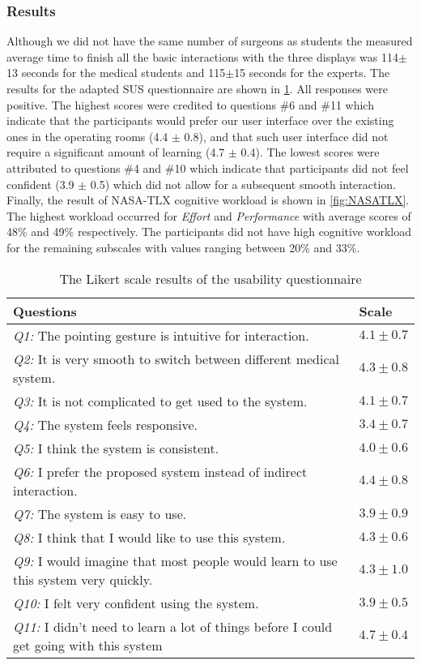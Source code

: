 \subsubsection{Results}
Although we did not have the same number of surgeons as students the measured average time to finish all the basic interactions with the three displays was 114$\pm$13 seconds for the medical students and 115$\pm$15 seconds for the experts. 
The results for the adapted SUS questionnaire are shown in \tablename{\ref{tb:questionnaire}}.
All responses were positive. The highest scores were credited to questions \#6 and \#11 which indicate that the participants would prefer our user interface over the existing ones in the operating rooms (4.4 $\pm$ 0.8), and that such user interface did not require a significant amount of learning (4.7 $\pm$ 0.4). The lowest scores were attributed to questions \#4 and \#10 which indicate that participants did not feel confident (3.9 $\pm$ 0.5) which did not allow for a subsequent smooth interaction. Finally, the result of NASA-TLX cognitive workload is shown in \figurename{\ref{fig:NASATLX}}. The highest workload occurred for \textit{Effort} and \textit{Performance} with average scores of 48\% and 49\% respectively. The participants did not have high cognitive workload for the remaining subscales with values ranging between 20\% and 33\%.
\begin{table}
	\caption{The Likert scale results of the usability questionnaire}
	\label{tb:questionnaire}
	\scriptsize
	\begin{center}
		\begin{tabular}{p{10cm}|p{1.2cm}}
			Questions & Scale \\
			\hline
			\textit{Q1:} The pointing gesture is intuitive for interaction. &  $4.1\pm0.7$ \\
			\textit{Q2:} It is very smooth to switch between different medical system. & $4.3\pm0.8$ \\
			\textit{Q3:} It is not complicated to get used to the system. & $4.1\pm0.7$ \\
			\textit{Q4:} The system feels responsive. & $3.4\pm0.7$\\
			\textit{Q5:} I  think the system is consistent. & $4.0\pm0.6$ \\
			\textit{Q6:} I prefer the proposed system instead of indirect interaction. & $4.4\pm0.8$ \\
			\textit{Q7:} The system is easy to use.& $3.9\pm0.9$ \\
			\textit{Q8:} I think that I would like to use this system. & $4.3\pm0.6$ \\
			\textit{Q9:} I would imagine that most people would learn to use this system very quickly. & $4.3\pm1.0$ \\
			\textit{Q10:} I felt very confident using the system. & $3.9\pm0.5$ \\
			\textit{Q11:} I didn't need to learn a lot of things before I could get going with this system & $4.7\pm0.4$
		\end{tabular}
	\end{center}
\end{table}
